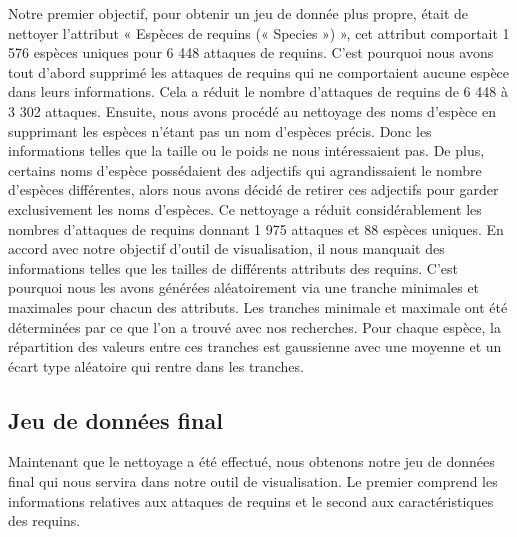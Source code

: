\documentclass{article}
\begin{document}
Notre premier objectif, pour obtenir un jeu de donnée plus propre, était de nettoyer l’attribut « Espèces de requins (« Species ») », cet attribut comportait 1 576 espèces uniques pour 6 448 attaques de requins.
C’est pourquoi nous avons tout d’abord supprimé les attaques de requins qui ne comportaient aucune espèce dans leurs informations. Cela a réduit le nombre d’attaques de requins de 6 448 à 3 302 attaques.
Ensuite, nous avons procédé au nettoyage des noms d’espèce en supprimant les espèces n’étant pas un nom d’espèces précis. Donc les informations telles que la taille ou le poids ne nous intéressaient pas.
De plus, certains noms d’espèce possédaient des adjectifs qui agrandissaient le nombre d’espèces différentes, alors nous avons décidé de retirer ces adjectifs pour garder exclusivement les noms d’espèces.
Ce nettoyage a réduit considérablement les nombres d’attaques de requins donnant 1 975 attaques et 88 espèces uniques.
En accord avec notre objectif d’outil de visualisation, il nous manquait des informations telles que les tailles de différents attributs des requins. C’est pourquoi nous les avons générées aléatoirement via une tranche minimales et maximales pour chacun des attributs. Les tranches minimale et maximale ont été déterminées par ce que l'on a trouvé avec nos recherches. Pour chaque espèce, la répartition des valeurs entre ces tranches est gaussienne avec une moyenne et un écart type aléatoire qui rentre dans les tranches.


\clearpage
\subsection{Jeu de données final}
Maintenant que le nettoyage a été effectué, nous obtenons notre jeu de données final qui nous servira dans notre outil de visualisation. Le premier comprend les informations relatives aux attaques de requins et le second aux caractéristiques des requins.
\end{document}
